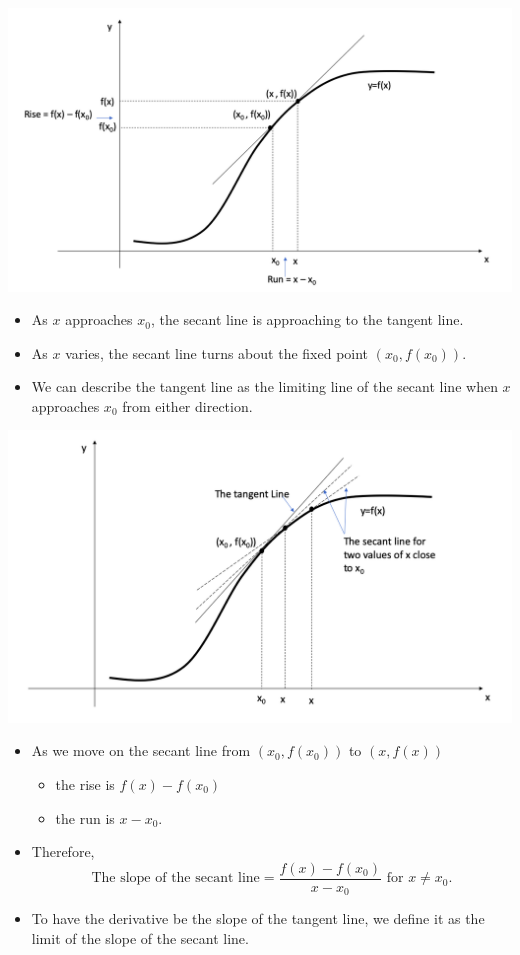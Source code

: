 \documentclass[]{book}
\providecommand{\tightlist}{%
  \setlength{\itemsep}{0pt}\setlength{\parskip}{0pt}}
\begin{document}
\begin{center}\includegraphics[width=0.7\linewidth]{figure/5Derivatives-2} \end{center}

\begin{itemize}
\tightlist
\item
  As \(x\) approaches \(x_0\), the secant line is approaching to the tangent line.
\item
  As \(x\) varies, the secant line turns about the fixed point \((x_0, f{(x_0)})\).
\item
  We can describe the tangent line as the limiting line of the secant line when \(x\) approaches \(x_0\) from either direction.
\end{itemize}

\begin{center}\includegraphics[width=0.7\linewidth]{figure/5Derivatives-3} \end{center}

\begin{itemize}
\tightlist
\item
  As we move on the secant line from \((x_0, f{(x_0)})\) to \((x, f{(x)})\)

  \begin{itemize}
  \tightlist
  \item
    the rise is \(f(x) - f(x_0)\)
  \item
    the run is \(x - x_0\).
  \end{itemize}
\item
  Therefore,
  \[\text{The slope of the secant line} = \frac{f(x) - f(x_0)}{x - x_0} \text{ for } x\neq x_0.\]
\item
  To have the derivative be the slope of the tangent line, we define it as the limit of the slope of the secant line.
\end{itemize}
\end{document}
